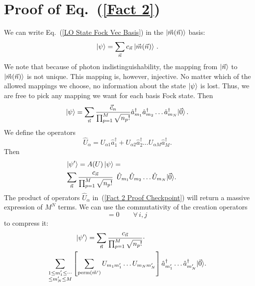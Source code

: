 \documentclass[aps,pra,twocolumn,superscriptaddress,floatfix,10pt]{revtex4}
\begin{document}
\section{Proof of Eq.~(\ref{Fact 2})}
\label{Proof of Fact 2}
We can write Eq.~(\ref{LO State Fock Vec Basis}) in the $\ket{\vec{m}(\vec{n})}$ basis:
\begin{equation}
\ket{\psi} = \sum_{\vec{n}} c_{\vec{n}} \ket{\vec{m}(\vec{n})} \,.
\end{equation}
We note that because of photon indistinguishability, the mapping from $\ket{\vec{n}}$ to $\ket{\vec{m}(\vec{n})}$ is not unique.  This mapping is, however, injective. No matter which of the allowed mappings we choose, no information about the state $\ket{\psi}$ is lost. Thus, we are free to pick any mapping we want for each basis Fock state. Then
\begin{equation}
\ket{\psi} = \sum_{\vec{n}} \frac{\vec{c}_n}{\prod_{p=1}^{M} \sqrt{n_p !}} \hat{a}_{m_1}^\dagger \hat{a}_{m_2}^\dagger \dots \hat{a}_{m_N}^\dagger |\vec{0} \rangle \,.
\end{equation}
We define the operators
\begin{equation}
\hat{U}_\alpha = U_{\alpha 1} \hat{a}^\dagger_1 + U_{\alpha 2} \hat{a}^\dagger_2 \dots U_{\alpha M} \hat{a}^\dagger_M.
\end{equation}
Then
\begin{eqnarray}
\label{Fact 2 Proof Checkpoint}
& \ket{\psi^\prime} = A(U) \ket{\psi} =  \quad \quad \quad \quad \quad \quad \quad \quad \quad \quad \\ & \nonumber
\sum_{\vec{n}} \frac{c_{\vec{n}}}{\prod_{p=1}^{M} \sqrt{n_p !}} \enspace \hat{U}_{m_1}  \hat{U}_{m_2}  \dots  \hat{U}_{m_N} |\vec{0} \rangle.
\end{eqnarray}
The product of operators $\hat{U}_\alpha$ in~(\ref{Fact 2 Proof Checkpoint}) will return a massive expression of $M^N$ terms. We can use the commutativity of the creation operators 
\begin{equation}
[\hat{a}_i ^ \dagger,\hat{a}_j ^ \dagger] = 0 \quad \quad \forall\, i,j \,
\end{equation}
to compress it:
\begin{eqnarray}
\ket{\psi^\prime} = \sum_{\vec{n}} \frac{c_{\vec{n}}}{\prod_{p=1}^{M} \sqrt{n_p !}} \cdot \quad \quad \quad \quad \quad \quad \quad \quad \quad \\  \nonumber \sum_{\substack{1 \le m_1^\prime \le \cdots \\ \le m_N^\prime \le M}}
\left[ \sum_{\textrm{perm}(\vec{m}^\prime)} U_{m_1 m_1^\prime} \dots U_{m_N m_N^\prime} \right] \hat{a}_{m_1^\prime}^\dagger \dots \hat{a}_{m_N^\prime}^\dagger |\vec{0} \rangle.
\end{eqnarray}
\end{document}
